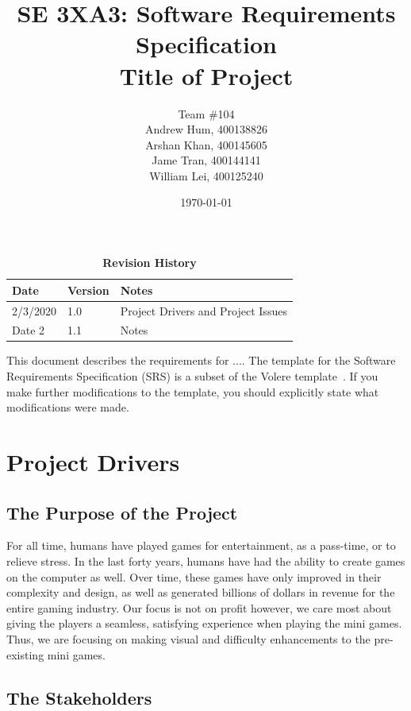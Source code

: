 \documentclass[12pt, titlepage]{article}
\title{SE 3XA3: Software Requirements Specification\\Title of Project}
\author{Team \#104
		\\ Andrew Hum, 400138826
		\\ Arshan Khan, 400145605
		\\ Jame Tran, 400144141
		\\ William Lei, 400125240
}
\date{\today}
\begin{document}
\maketitle

\tableofcontents
\listoftables
\listoffigures

\begin{table}[bp]
\caption{\bf Revision History}
\begin{tabularx}{\textwidth}{p{3cm}p{2cm}X}
\toprule {\bf Date} & {\bf Version} & {\bf Notes}\\
\midrule
2/3/2020 & 1.0 & Project Drivers and Project Issues\\
Date 2 & 1.1 & Notes\\
\bottomrule
\end{tabularx}
\end{table}

\newpage


This document describes the requirements for ....  The template for the Software Requirements Specification (SRS) is a subset of the Volere template~\citep{RobertsonAndRobertson2012}.  If you make further modifications to the template, you should explicitly state what modifications were made.

\section{Project Drivers}

\subsection{The Purpose of the Project}

For all time, humans have played games for entertainment, as a pass-time, or to relieve stress. In the last forty years, humans have had the ability to create games on the computer as well. Over time, these games have only improved in their complexity and design, as well as generated billions of dollars in revenue for the entire gaming industry. Our focus is not on profit however, we care most about giving the players a seamless, satisfying experience when playing the mini games. Thus, we are focusing on making visual and difficulty enhancements to the pre-existing mini games.

\subsection{The Stakeholders}
\end{document}
